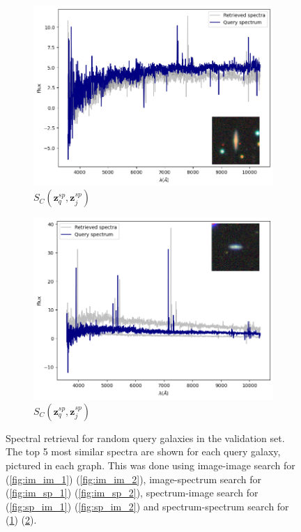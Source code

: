 \documentclass[a4paper,12pt]{article}
\begin{document}
\begin{figure}[H]
    \begin{subfigure}[b]{0.45\textwidth}
        \centering
        \includegraphics[width=\textwidth]{../figures/spectral_retrieval_sp_sp_1}
        \caption{$S_C(\mathbf{z}_q^{sp}, \mathbf{z}_j^{sp})$}
        \label{fig:sp_sp_1}
    \end{subfigure}%
    \hfill
    \begin{subfigure}[b]{0.45\textwidth}
        \centering
        \includegraphics[width=\textwidth]{../figures/spectral_retrieval_sp_sp_2}
        \caption{$S_C(\mathbf{z}_q^{sp}, \mathbf{z}_j^{sp})$}
        \label{fig:sp_sp_2}
    \end{subfigure}

    \caption{Spectral retrieval for random query galaxies in the validation set. The top 5 most similar spectra are shown for each query galaxy, pictured in each graph. This was done using image-image search for (\ref{fig:im_im_1}) (\ref{fig:im_im_2}), image-spectrum search for (\ref{fig:im_sp_1}) (\ref{fig:im_sp_2}), spectrum-image search for (\ref{fig:sp_im_1}) (\ref{fig:sp_im_2}) and spectrum-spectrum search for (\ref{fig:sp_sp_1}) (\ref{fig:sp_sp_2}).}
    \label{fig:spectral_retrieval}
\end{figure}
\end{document}
